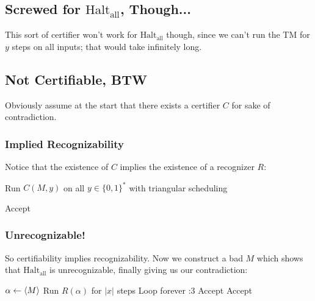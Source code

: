 \documentclass[12pt]{article}
\begin{document}
\subsection{Screwed for \texorpdfstring{$\text{Halt}_\text{all}$}{Halt\_all}, Though...}

This sort of certifier won't work for $\text{Halt}_\text{all}$ though,
since we can't run the TM for $y$ steps on all inputs; that would take infinitely long.

\pagebreak

\subsection{Not Certifiable, BTW}

Obviously assume at the start that there exists a certifier $C$ for sake of contradiction.

\subsubsection{Implied Recognizability}

Notice that the existence of $C$ implies the existence of a recognizer $R$:
\begin{algorithmic}[1]
        \State Run $C(M, y)$ on all $y \in \{0, 1\}^*$ with triangular scheduling
        
            \State Accept
        \Else
        \EndIf
    \EndProcedure
\end{algorithmic}

\subsubsection{Unrecognizable!}

So certifiability implies recognizability.
Now we construct a bad $M$ which shows that $\text{Halt}_\text{all}$ is
unrecognizable, finally giving us our contradiction:
\begin{algorithmic}[1]
        \State $\alpha \gets \Braket{M}$
        \State Run $R(\alpha)$ for $|x|$ steps
            \State Loop forever :3
            \State Accept
            \State Accept
        \EndIf
    \EndProcedure
\end{algorithmic}
\end{document}
